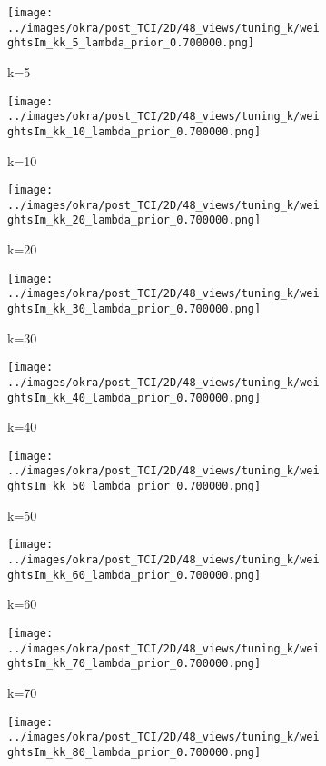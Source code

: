 \documentclass[journal]{IEEEtran}
\begin{document}


\begin{figure}[h]
    \begin{subfigure}[b]{0.24\linewidth}
        \texttt{[image: ../images/okra/post\_TCI/2D/48\_views/tuning\_k/weightsIm\_kk\_5\_lambda\_prior\_0.700000.png]}
        \caption{k=5}
     \end{subfigure}     
  \begin{subfigure}[b]{0.24\linewidth}
        \texttt{[image: ../images/okra/post\_TCI/2D/48\_views/tuning\_k/weightsIm\_kk\_10\_lambda\_prior\_0.700000.png]}
        \caption{k=10}
     \end{subfigure} 
  \begin{subfigure}[b]{0.24\linewidth}
        \texttt{[image: ../images/okra/post\_TCI/2D/48\_views/tuning\_k/weightsIm\_kk\_20\_lambda\_prior\_0.700000.png]}
        \caption{k=20}
     \end{subfigure}
  \begin{subfigure}[b]{0.24\linewidth}
        \texttt{[image: ../images/okra/post\_TCI/2D/48\_views/tuning\_k/weightsIm\_kk\_30\_lambda\_prior\_0.700000.png]}
        \caption{k=30}
     \end{subfigure}
  \begin{subfigure}[b]{0.24\linewidth}
        \texttt{[image: ../images/okra/post\_TCI/2D/48\_views/tuning\_k/weightsIm\_kk\_40\_lambda\_prior\_0.700000.png]}
        \caption{k=40}
     \end{subfigure}
  \begin{subfigure}[b]{0.24\linewidth}
        \texttt{[image: ../images/okra/post\_TCI/2D/48\_views/tuning\_k/weightsIm\_kk\_50\_lambda\_prior\_0.700000.png]}
        \caption{k=50}
     \end{subfigure}
   \begin{subfigure}[b]{0.24\linewidth}
        \texttt{[image: ../images/okra/post\_TCI/2D/48\_views/tuning\_k/weightsIm\_kk\_60\_lambda\_prior\_0.700000.png]}
        \caption{k=60}
     \end{subfigure}
   \begin{subfigure}[b]{0.24\linewidth}
        \texttt{[image: ../images/okra/post\_TCI/2D/48\_views/tuning\_k/weightsIm\_kk\_70\_lambda\_prior\_0.700000.png]}
        \caption{k=70}
     \end{subfigure}
  \begin{subfigure}[b]{0.24\linewidth}
        \texttt{[image: ../images/okra/post\_TCI/2D/48\_views/tuning\_k/weightsIm\_kk\_80\_lambda\_prior\_0.700000.png]}

\end{subfigure}
\end{figure}
\end{document}
